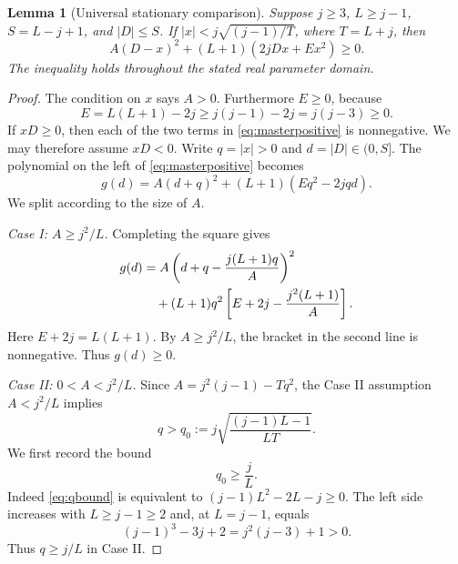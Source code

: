 \documentclass[11pt,a4paper]{article}
\newtheorem{lemma}[theorem]{Lemma}
\begin{document}
\begin{lemma}[Universal stationary comparison]\label{lem:universal}
Suppose $j\ge3$, $L\ge j-1$, $S=L-j+1$, and $|D|\le S$. If $|x|<j\sqrt{(j-1)/T}$, where $T=L+j$, then
\begin{equation}\label{eq:masterpositive}
 \boxed{\quad A(D-x)^2+(L+1)(2jDx+Ex^2)\ge0.\quad}
\end{equation}
The inequality holds throughout the stated real parameter domain.
\end{lemma}
\begin{proof}
The condition on $x$ says $A>0$. Furthermore $E\ge0$, because
\[
 E=L(L+1)-2j\ge j(j-1)-2j=j(j-3)\ge0.
\]
If $xD\ge0$, then each of the two terms in \eqref{eq:masterpositive} is nonnegative. We may therefore assume $xD<0$. Write $q=|x|>0$ and $d=|D|\in(0,S]$. The polynomial on the left of \eqref{eq:masterpositive} becomes
\begin{equation}\label{eq:g}
 g(d)=A(d+q)^2+(L+1)(Eq^2-2jqd).
\end{equation}
We split according to the size of $A$.

\smallskip\noindent\emph{Case I: $A\ge j^2/L$.}
Completing the square gives
\begin{align}\label{eq:square1}
 g(d)&=A\left(d+q-\frac{j(L+1)q}{A}\right)^2\notag\\
 &\quad+(L+1)q^2\left[E+2j-\frac{j^2(L+1)}{A}\right].
\end{align}
Here $E+2j=L(L+1)$. By $A\ge j^2/L$, the bracket in the second line is nonnegative. Thus $g(d)\ge0$.

\smallskip\noindent\emph{Case II: $0<A<j^2/L$.}
Since $A=j^2(j-1)-Tq^2$, the Case II assumption $A<j^2/L$ implies
\begin{equation}\label{eq:qmin}
 q>q_0:=j\sqrt{\frac{(j-1)L-1}{LT}}.
\end{equation}
We first record the bound
\begin{equation}\label{eq:qbound}
 q_0\ge\frac jL.
\end{equation}
Indeed \eqref{eq:qbound} is equivalent to $(j-1)L^2-2L-j\ge0$. The left side increases with $L\ge j-1\ge2$ and, at $L=j-1$, equals
\[
 (j-1)^3-3j+2=j^2(j-3)+1>0.
\]
Thus $q\ge j/L$ in Case II.


\end{proof}
\end{document}
